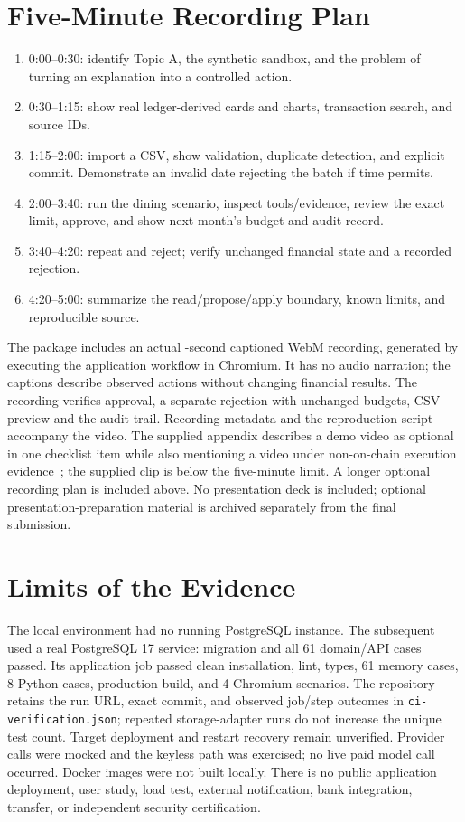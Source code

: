 \documentclass[conference,a4paper]{IEEEtran}
\begin{document}
\section{Five-Minute Recording Plan}
\begin{enumerate}
\item 0:00--0:30: identify Topic A, the synthetic sandbox, and the problem of turning an explanation into a controlled action.
\item 0:30--1:15: show real ledger-derived cards and charts, transaction search, and source IDs.
\item 1:15--2:00: import a CSV, show validation, duplicate detection, and explicit commit. Demonstrate an invalid date rejecting the batch if time permits.
\item 2:00--3:40: run the dining scenario, inspect tools/evidence, review the exact limit, approve, and show next month's budget and audit record.
\item 3:40--4:20: repeat and reject; verify unchanged financial state and a recorded rejection.
\item 4:20--5:00: summarize the read/propose/apply boundary, known limits, and reproducible source.
\end{enumerate}
The package includes an actual \DemoSeconds{}-second captioned WebM recording, generated by executing the application workflow in Chromium. It has no audio narration; the captions describe observed actions without changing financial results. The recording verifies approval, a separate rejection with unchanged budgets, CSV preview and the audit trail. Recording metadata and the reproduction script accompany the video. The supplied appendix describes a demo video as optional in one checklist item while also mentioning a video under non-on-chain execution evidence~\cite{competition}; the supplied clip is below the five-minute limit. A longer optional recording plan is included above. No presentation deck is included; optional presentation-preparation material is archived separately from the final submission.

\section{Limits of the Evidence}
The local environment had no running PostgreSQL instance. The subsequent \VerifiedCI{} used a real PostgreSQL 17 service: migration and all 61 domain/API cases passed. Its application job passed clean installation, lint, types, 61 memory cases, 8 Python cases, production build, and 4 Chromium scenarios. The repository retains the run URL, exact commit, and observed job/step outcomes in \texttt{ci-verification.json}; repeated storage-adapter runs do not increase the unique test count. Target deployment and restart recovery remain unverified. Provider calls were mocked and the keyless path was exercised; no live paid model call occurred. Docker images were not built locally. There is no public application deployment, user study, load test, external notification, bank integration, transfer, or independent security certification.
\end{document}
